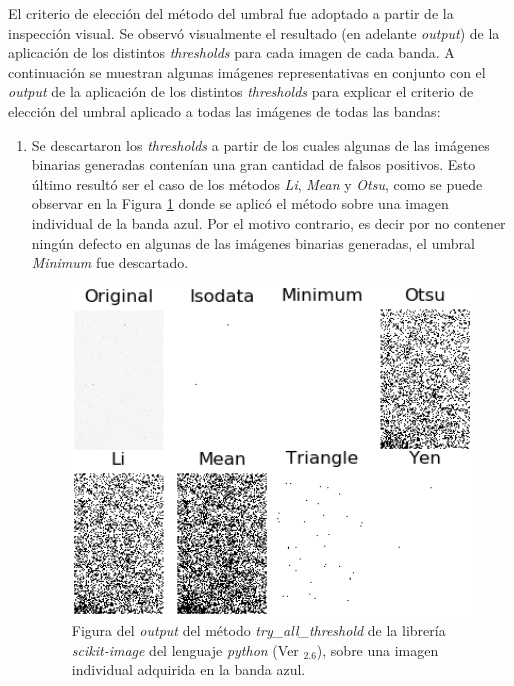 El criterio de elección del método del umbral fue adoptado a partir de la inspección visual. Se observó visualmente el resultado (en adelante \textit{output}) de la aplicación de los distintos \textit{thresholds} para cada imagen de cada banda. A continuación se muestran algunas imágenes representativas en conjunto con el \textit{output} de la aplicación de los distintos \textit{thresholds} para explicar el criterio de elección del umbral aplicado a todas las imágenes de todas las bandas:
\begin{enumerate}
\justifying
\item Se descartaron los \textit{thresholds} a partir de los cuales algunas de las imágenes binarias generadas contenían una gran cantidad de falsos positivos. Esto último resultó ser el caso de los métodos \textit{Li}\cite{Lie}, \textit{Mean}\cite{Glasmean} y \textit{Otsu}\cite{otsuu}, como se puede observar en la Figura \ref{fig:threshcom} donde se aplicó el método sobre una imagen individual de la banda azul. Por el motivo contrario, es decir por no contener ningún defecto en algunas de las imágenes binarias generadas, el umbral \textit{Minimum}\cite{pericles} fue descartado.
\begin{figure}[H]
	\centering
	\includegraphics[width=1.0\textwidth]{Figs/defectosZEISS/thresh_comparison.png}
	\caption{Figura del \textit{output} del método \textit{try\_all\_threshold} de la librería \textit{scikit-image} del lenguaje \textit{python} (Ver \href{https://github.com/jrr1984/defects_analysis/blob/master/try_all_thresholds.py}{\faGithub$_{2.6}$}), sobre una imagen individual adquirida en la banda azul.} 
	\label{fig:threshcom}
\end{figure}


\end{enumerate}
